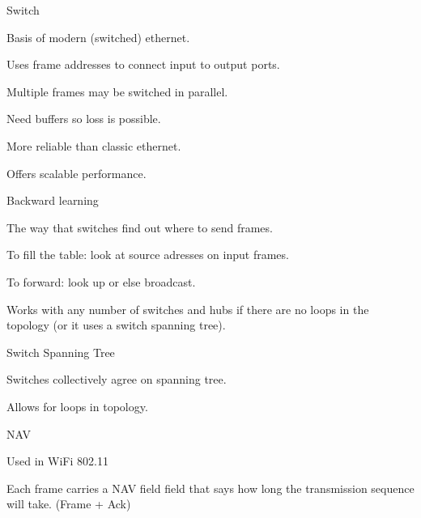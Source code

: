 \documentclass[main.tex]{subfiles}
\begin{document}
\full{}
\begin{card}{Switch}
\item Basis of modern (switched) ethernet.
\item Uses frame addresses to connect input to output ports.
\item Multiple frames may be switched in parallel.
\item Need buffers so loss is possible.
\item More reliable than classic ethernet.
\item Offers scalable performance.
\end{card}

\full{}
\begin{card}{Backward learning}
\item The way that switches find out where to send frames.
\item To fill the table: look at source adresses on input frames.
\item To forward: look up or else broadcast.
\item Works with any number of switches and hubs if there are no loops in the topology (or it uses a switch spanning tree).
\end{card}

\full{}
\begin{card}{Switch Spanning Tree}
\item Switches collectively agree on spanning tree.
\item Allows for loops in topology.
\end{card}

\begin{card}{NAV}
\item Used in WiFi 802.11
\item Each frame carries a NAV field field that says how long the transmission sequence will take. (Frame + Ack)
\end{card}
\end{document}
